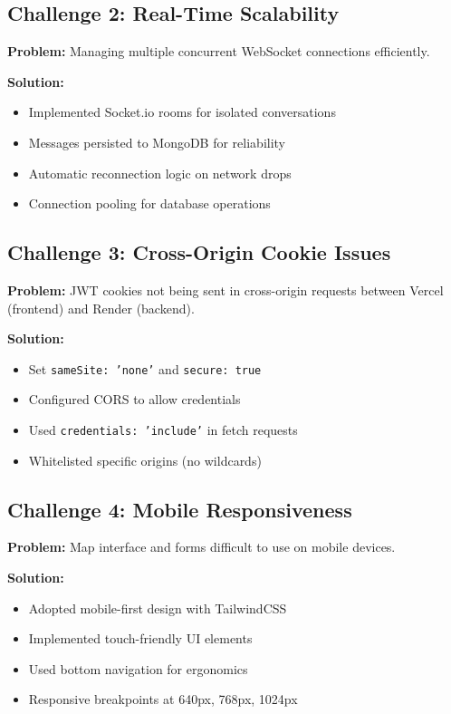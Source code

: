 \documentclass[12pt,a4paper]{article}
\begin{document}
\subsection{Challenge 2: Real-Time Scalability}

\textbf{Problem:} Managing multiple concurrent WebSocket connections efficiently.

\textbf{Solution:}
\begin{itemize}
    \item Implemented Socket.io rooms for isolated conversations
    \item Messages persisted to MongoDB for reliability
    \item Automatic reconnection logic on network drops
    \item Connection pooling for database operations
\end{itemize}

\subsection{Challenge 3: Cross-Origin Cookie Issues}

\textbf{Problem:} JWT cookies not being sent in cross-origin requests between Vercel (frontend) and Render (backend).

\textbf{Solution:}
\begin{itemize}
    \item Set \texttt{sameSite: 'none'} and \texttt{secure: true}
    \item Configured CORS to allow credentials
    \item Used \texttt{credentials: 'include'} in fetch requests
    \item Whitelisted specific origins (no wildcards)
\end{itemize}

\subsection{Challenge 4: Mobile Responsiveness}

\textbf{Problem:} Map interface and forms difficult to use on mobile devices.

\textbf{Solution:}
\begin{itemize}
    \item Adopted mobile-first design with TailwindCSS
    \item Implemented touch-friendly UI elements
    \item Used bottom navigation for ergonomics
    \item Responsive breakpoints at 640px, 768px, 1024px
\end{itemize}
\end{document}
